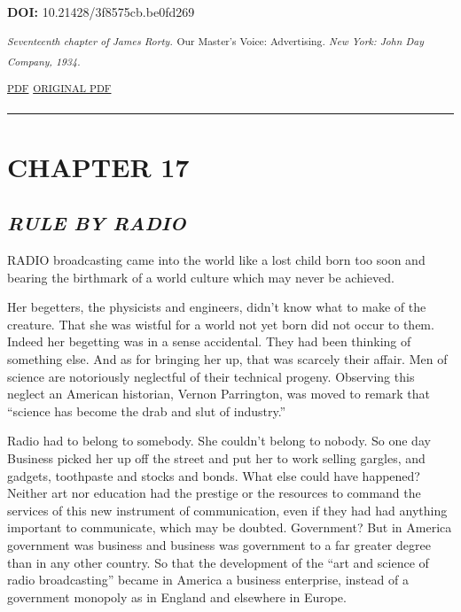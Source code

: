 \textbf{DOI:} 10.21428/3f8575cb.be0fd269

\textsuperscript{\emph{Seventeenth chapter of James Rorty.}}
\textsuperscript{Our Master's Voice: Advertising\emph{. New York: John
Day Company, 1934.}}

\textsuperscript{\href{https://github.com/mediastudiespress/singles/raw/master/public_domain/rorty-1934/pdfs/21-rorty-1934-chapter-seventeen-msp.pdf}{PDF}}
\textsuperscript{\textbar{}}
\textsuperscript{\href{https://github.com/mediastudiespress/singles/raw/master/public_domain/rorty-1934/pdfs/21-rorty-1934-chapter-seventeen-original.pdf}{ORIGINAL
PDF}}

\begin{center}\rule{0.5\linewidth}{\linethickness}\end{center}

\hypertarget{chapter-17}{%
\section{CHAPTER 17}\label{chapter-17}}

\hypertarget{rule-by-radio}{%
\subsection{\texorpdfstring{\emph{RULE BY
RADIO}}{RULE BY RADIO}}\label{rule-by-radio}}

RADIO broadcasting came into the world like a lost child born too soon
and bearing the birthmark of a world culture which may never be
achieved.

Her begetters, the physicists and engineers, didn't know what to make of
the creature. That she was wistful for a world not yet born did not
occur to them. Indeed her begetting was in a sense accidental. They had
been thinking of something else. And as for bringing her up, that was
scarcely their affair. Men of science are notoriously neglectful of
their technical progeny. Observing this neglect an American historian,
Vernon Parrington, was moved to remark that ``science has become the
drab and slut of industry.''

Radio had to belong to somebody. She couldn't belong to nobody. So one
day Business picked her up off the street and put her to work selling
gargles, and gadgets, toothpaste and stocks and bonds. What else could
have happened? Neither art nor education had the prestige or the
resources to command the services of this new instrument of
communication, even if they had had anything important to communicate,
which may be doubted. Government? But in America government was business
and business was government to a far greater degree than in any other
country. So that the development of the ``art and science of radio
broadcasting'' became in America a business enterprise, instead of a
government monopoly as in England and elsewhere in Europe.

